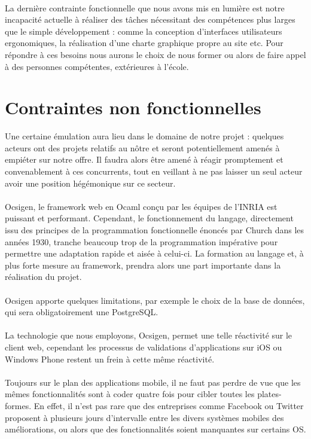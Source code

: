 \documentclass{life-fr}
\begin{document}
\\
La dernière contrainte fonctionnelle que nous avons mis en lumière est notre incapacité actuelle à réaliser des tâches nécessitant des compétences plus larges que le simple développement : comme la conception d'interfaces utilisateurs ergonomiques, la réalisation d'une charte graphique propre au site etc. Pour répondre à ces besoins nous aurons le choix de nous former ou alors de faire appel à des personnes compétentes, extérieures à l'école.

\section{Contraintes non fonctionnelles}

Une certaine émulation aura lieu dans le domaine de notre projet : quelques acteurs ont des projets relatifs au nôtre et seront potentiellement amenés à empiéter sur notre offre. Il faudra alors être amené à réagir promptement et convenablement à ces concurrents, tout en veillant à ne pas laisser un seul acteur avoir une position hégémonique sur ce secteur.\\
\\
Ocsigen, le framework web en Ocaml conçu par les équipes de l'INRIA est puissant et performant. Cependant, le fonctionnement du langage, directement issu des principes de la programmation fonctionnelle énoncés par Church dans les années 1930, tranche beaucoup trop de la programmation impérative pour permettre une adaptation rapide et aisée à celui-ci. La formation au langage et, à plus forte mesure au framework, prendra alors une part importante dans la réalisation du projet. \\
\\
Ocsigen apporte quelques limitations, par exemple le choix de la base de données, qui sera obligatoirement une PostgreSQL.\\
\\
La technologie que nous employons, Ocsigen, permet une telle réactivité sur le client web, cependant les processus de validations d'applications sur iOS ou Windows Phone restent un frein à cette même réactivité. \\
\\
Toujours sur le plan des applications mobile, il ne faut pas perdre de vue que les mêmes fonctionnalités sont à coder quatre fois pour cibler toutes les plates-formes. En effet, il n'est pas rare que des entreprises comme Facebook ou Twitter proposent à plusieurs jours d'intervalle entre les divers systèmes mobiles des améliorations, ou alors que des fonctionnalités soient manquantes sur certains OS.
\end{document}
